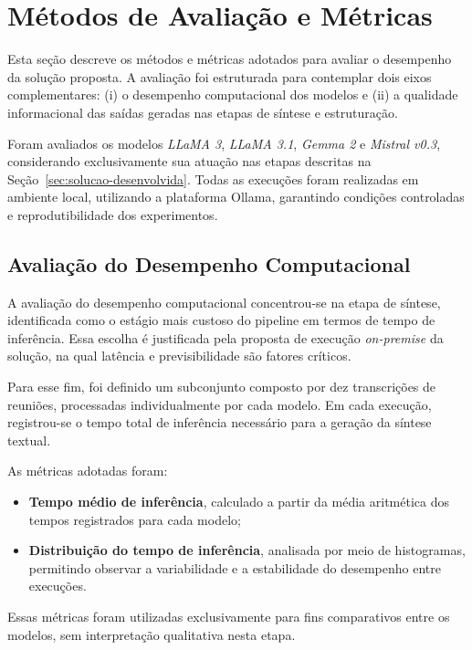 \section{Métodos de Avaliação e Métricas}
\label{sec:metrica-de-avaliacao}

Esta seção descreve os métodos e métricas adotados para avaliar o desempenho da solução proposta. A avaliação foi estruturada para contemplar dois eixos complementares: (i) o desempenho computacional dos modelos e (ii) a qualidade informacional das saídas geradas nas etapas de síntese e estruturação.

Foram avaliados os modelos \textit{LLaMA 3}, \textit{LLaMA 3.1}, \textit{Gemma 2} e \textit{Mistral v0.3}, considerando exclusivamente sua atuação nas etapas descritas na Seção~\ref{sec:solucao-desenvolvida}. Todas as execuções foram realizadas em ambiente local, utilizando a plataforma Ollama, garantindo condições controladas e reprodutibilidade dos experimentos.

\subsection{Avaliação do Desempenho Computacional}

A avaliação do desempenho computacional concentrou-se na etapa de síntese, identificada como o estágio mais custoso do pipeline em termos de tempo de inferência. Essa escolha é justificada pela proposta de execução \textit{on-premise} da solução, na qual latência e previsibilidade são fatores críticos.

Para esse fim, foi definido um subconjunto composto por dez transcrições de reuniões, processadas individualmente por cada modelo. Em cada execução, registrou-se o tempo total de inferência necessário para a geração da síntese textual.

As métricas adotadas foram:
\begin{itemize}
	\item \textbf{Tempo médio de inferência}, calculado a partir da média aritmética dos tempos registrados para cada modelo;
	\item \textbf{Distribuição do tempo de inferência}, analisada por meio de histogramas, permitindo observar a variabilidade e a estabilidade do desempenho entre execuções.
\end{itemize}

Essas métricas foram utilizadas exclusivamente para fins comparativos entre os modelos, sem interpretação qualitativa nesta etapa.

